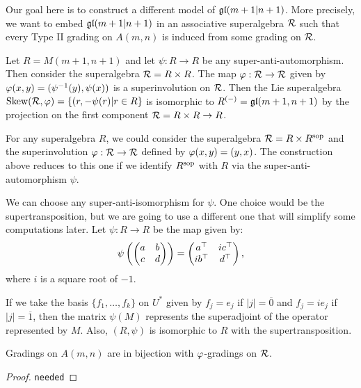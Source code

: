 Our goal here is to construct a different model of $\mathfrak{gl}(m+1 | n+1)$. More precisely, we want to embed $\mathfrak{gl}(m+1 | n+1)$ in an associative superalgebra $\mathcal R$ such that every Type II grading on $A(m,n)$ is induced from some grading on $\mathcal R$.

Let $R = M(m+1, n+1)$ and let $\psi: R\to R$ be any super-anti-automorphism. Then consider the superalgebra $\mathcal R = R\times R$. The map $\varphi: \mathcal R \to \mathcal R$ given by $\varphi(x,y) = (\psi^{-1}(y), \psi(x))$ is a superinvolution on $\mathcal R$. Then the Lie superalgebra $\operatorname{Skew} (\mathcal R, \varphi) = \{(r, -\psi(r) | r\in R\}$ is isomorphic to $R^{(-)} = \mathfrak{gl}(m+1, n+1)$ by the projection on the first component $\mathcal R = R\times R \to R$.

\begin{remark}
	For any superalgebra $R$, we could consider the superalgebra $\mathcal R = R \times R^{\mathrm{sop}}$ and the superinvolution $\varphi: \mathcal R \to \mathcal R$ defined by $\varphi(x, y) = (y, x)$. The construction above reduces to this one if we identify $R^{\mathrm{sop}}$ with $R$ via the super-anti-automorphism $\psi$.
\end{remark}

We can choose any super-anti-isomorphism for $\psi$. One choice would be the supertransposition, but we are going to use a different one that will simplify some computations later. Let $\psi: R \to R$ be the map given by:
\[
	\psi\left(
	\begin{pmatrix}
			a & b \\
			c & d
		\end{pmatrix}\right) =
	\begin{pmatrix}
		a^{\top}   & i c^{\top} \\
		i b^{\top} & d^{\top}
	\end{pmatrix},
\]
where $i$ is a square root of $-1$.

\begin{remark}
	If we take the basis $\{f_1, \ldots, f_k\}$ on $U^*$ given by $f_j = e_j $ if $|j| = \overline 0$ and $f_j = ie_j$ if $|j| = \overline 1$, then the matrix $\psi (M)$ represents the superadjoint of the operator represented by $M$. Also, $(R, \psi)$ is isomorphic to $R$ with the supertransposition.
\end{remark}

\begin{prop}
	Gradings on $A(m,n)$ are in bijection with $\varphi$-gradings on $\mathcal R$.
\end{prop}

\begin{proof}
	{\tt needed}
\end{proof}

